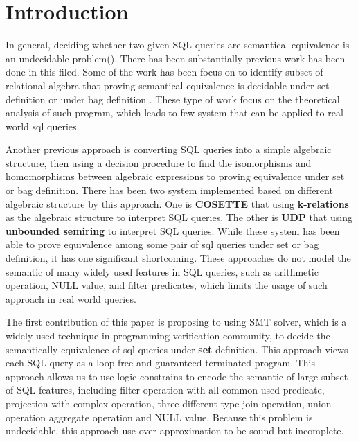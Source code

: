 \section{Introduction}\label{sec:introduction}
%

In general, deciding whether two given SQL queries are semantical equivalence is an undecidable problem().
%
There has been substantially previous work has been done in this filed.
Some of the work has been focus on to identify subset of relational algebra that proving semantical equivalence is decidable 
under set definition  or under bag definition .
%
These type of work focus on the theoretical analysis of such program, which leads to few system that can be applied to real world sql queries.
%

Another previous approach is converting SQL queries into a simple algebraic structure, 
then using a decision procedure to find the isomorphisms and homomorphisms between algebraic expressions to proving equivalence under set or bag definition.
%
There has been two system implemented based on different algebraic structure by this approach.
%
One is \textbf{COSETTE}  that using \textbf{k-relations} as the algebraic structure to interpret SQL queries.
%
The other is \textbf{UDP}  that using \textbf{unbounded semiring} to interpret SQL queries.
While these system has been able to prove equivalence among some pair of sql queries under set or bag definition, it has one significant shortcoming.
%
These approaches do not model the semantic of many widely used features in SQL queries, such as arithmetic operation, NULL value, and filter predicates,
which limits the usage of such approach in real world queries.
%

The first contribution of this paper is proposing to using SMT solver, which is a widely used technique in programming verification community, 
to decide the semantically equivalence of sql queries under \textbf{set} definition.
%
This approach views each SQL query as a loop-free and guaranteed terminated program. 
%
This approach allows us to use logic constrains to encode the semantic of large subset of SQL features,
including filter operation with all common used predicate, projection with complex operation, three different type join operation, union operation aggregate
operation and NULL value.
%
Because this problem is undecidable, this approach use over-approximation to be sound but incomplete.
%

